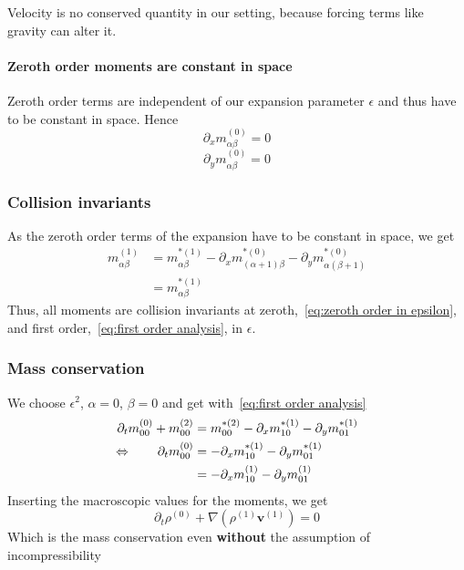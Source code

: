 \documentclass{article}
\begin{document}
Velocity is no conserved quantity in our setting, because forcing terms like gravity can alter it.

\paragraph{Zeroth order moments are constant in space}
\label{par:Zeroth order moments are constant in space}
Zeroth order terms are independent of our expansion parameter $\epsilon$ and thus have to be constant in space. Hence
\begin{equation}
  \partial_x m_{\alpha\beta}^{(0)} = 0
\end{equation}
\begin{equation}
  \partial_y m_{\alpha\beta}^{(0)} = 0
\end{equation}


\subsubsection{Collision invariants}
\label{subs:Collision invariants}
As the zeroth order terms of the expansion have to be constant in space, we get
\begin{equation}
  \label{eq:first order analysis}
  \begin{aligned}
    m_{\alpha\beta}^{(1)}
    & = m_{\alpha\beta}^{*(1)}
    - \partial_x m_{(\alpha+1)\beta}^{*(0)}
    - \partial_y m_{\alpha(\beta+1)}^{*(0)} \\
    & = m_{\alpha\beta}^{*(1)}
  \end{aligned}
\end{equation}
Thus, all moments are collision invariants at zeroth,~\eqref{eq:zeroth order in epsilon}, and first order,~\eqref{eq:first order analysis}, in $\epsilon$.

\subsubsection{Mass conservation}
\label{subs:Mass conservation}

We choose $\epsilon^2$, $\alpha=0$, $\beta=0$ and get with~\eqref{eq:first order analysis}
\begin{equation}
    \begin{aligned}
      \partial_t m_{00}^{(0)} + m_{00}^{(2)} & =  m_{00}^{*(2)} - \partial_x m_{10}^{*(1)} - \partial_y m_{01}^{*(1)} \\
      \Leftrightarrow \qquad \partial_t m_{00}^{(0)} & =  - \partial_x m_{10}^{*(1)} - \partial_y m_{01}^{*(1)} \\
      & =  - \partial_x m_{10}^{(1)} - \partial_y m_{01}^{(1)}
    \end{aligned}
\end{equation}
Inserting the macroscopic values for the moments, we get
\begin{equation}
  \partial_t \rho^{(0)} + \nabla (\rho^{(1)} \mathbf{v}^{(1)}) = 0
\end{equation}
Which is the mass conservation even \textbf{without} the assumption of incompressibility
\end{document}
